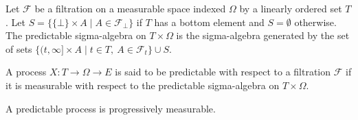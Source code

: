 \begin{definition}\label{def:predictableMeasurableSpace}
  \leanok
Let $\mathcal{F}$ be a filtration on a measurable space indexed $\Omega$ by a linearly ordered set $T$.
Let $S = \{\{\bot\} \times A \mid A \in \mathcal{F}_\bot\}$ if $T$ has a bottom element and $S = \emptyset$ otherwise.
The predictable sigma-algebra on $T \times \Omega$ is the sigma-algebra generated by the set of sets $\{(t, \infty] \times A \mid t \in T, \: A \in \mathcal{F}_t\} \cup S$.
\end{definition}


\begin{definition}\label{def:predictable}
  \leanok
A process $X : T \to \Omega \to E$ is said to be predictable with respect to a filtration $\mathcal{F}$ if it is measurable with respect to the predictable sigma-algebra on $T \times \Omega$.
\end{definition}


\begin{lemma}\label{lem:Predictable.progressive}
  \leanok
A predictable process is progressively measurable.
\end{lemma}

